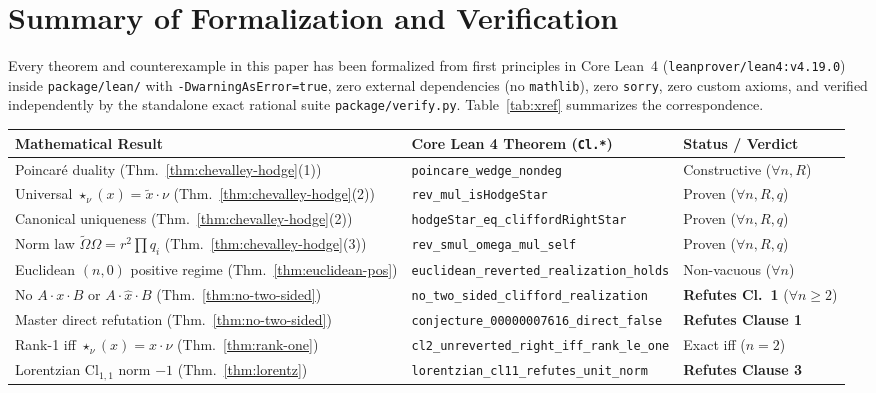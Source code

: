 \documentclass[11pt]{article}
\theoremstyle{definition}
\newcommand{\Cl}{\mathrm{Cl}}
\begin{document}
\section{Summary of Formalization and Verification}

Every theorem and counterexample in this paper has been formalized from first principles in Core Lean~4 (\texttt{leanprover/lean4:v4.19.0}) inside \texttt{package/lean/} with \texttt{-DwarningAsError=true}, zero external dependencies (no \texttt{mathlib}), zero \texttt{sorry}, zero custom axioms, and verified independently by the standalone exact rational suite \texttt{package/verify.py}. Table~\ref{tab:xref} summarizes the correspondence.

\begin{table}[ht]
\centering
\footnotesize
\setlength{\tabcolsep}{3pt}
\begin{tabular}{@{}lll@{}}
\toprule
\textbf{Mathematical Result} & \textbf{Core Lean 4 Theorem (\texttt{Cl.*})} & \textbf{Status / Verdict} \\
\midrule
Poincar\'e duality (Thm.~\ref{thm:chevalley-hodge}(1)) & \texttt{poincare\_wedge\_nondeg} & Constructive ($\forall n, R$) \\
Universal $\star_\nu(x) = \widetilde{x}\cdot\nu$ (Thm.~\ref{thm:chevalley-hodge}(2)) & \texttt{rev\_mul\_isHodgeStar} & Proven ($\forall n, R, q$) \\
Canonical uniqueness (Thm.~\ref{thm:chevalley-hodge}(2)) & \texttt{hodgeStar\_eq\_cliffordRightStar} & Proven ($\forall n, R, q$) \\
Norm law $\widetilde{\Omega}\Omega = r^2\prod q_i$ (Thm.~\ref{thm:chevalley-hodge}(3)) & \texttt{rev\_smul\_omega\_mul\_self} & Proven ($\forall n, R, q$) \\
Euclidean $(n,0)$ positive regime (Thm.~\ref{thm:euclidean-pos}) & \texttt{euclidean\_reverted\_realization\_holds} & Non-vacuous ($\forall n$) \\
No $A\cdot x\cdot B$ or $A\cdot\hat{x}\cdot B$ (Thm.~\ref{thm:no-two-sided}) & \texttt{no\_two\_sided\_clifford\_realization} & \textbf{Refutes Cl.~1} ($\forall n \ge 2$) \\
Master direct refutation (Thm.~\ref{thm:no-two-sided}) & \texttt{conjecture\_00000007616\_direct\_false} & \textbf{Refutes Clause 1} \\
Rank-1 iff $\star_\nu(x) = x\cdot\nu$ (Thm.~\ref{thm:rank-one}) & \texttt{cl2\_unreverted\_right\_iff\_rank\_le\_one} & Exact iff ($n = 2$) \\
Lorentzian $\Cl_{1,1}$ norm $-1$ (Thm.~\ref{thm:lorentz}) & \texttt{lorentzian\_cl11\_refutes\_unit\_norm} & \textbf{Refutes Clause 3} \\

\end{tabular}
\end{table}
\end{document}

